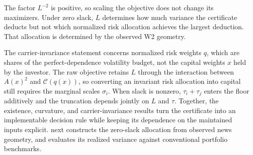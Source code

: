 The factor $L^{-2}$ is positive, so scaling the objective does not change its
maximizers.
Under zero slack, $L$ determines how much variance the certificate deducts
but not which normalized risk allocation achieves the largest deduction.
That allocation is determined by the observed W2 geometry.

The carrier-invariance statement concerns normalized risk weights
$q$, which are shares of the perfect-dependence volatility budget,
not the capital weights $x$ held by the investor.
The raw objective retains $L$ through the interaction between $A(x)^2$ and
$\mathcal C(q(x))$, so converting an invariant risk allocation into capital
still requires the marginal scales $\sigma_i$.
When slack is nonzero, $\tau_i+\tau_j$ enters the floor additively and the
truncation depends jointly on $L$ and $\tau$.
Together, the existence, curvature, and carrier-invariance results
turn the certificate into an implementable decision rule while
keeping its dependence on the maintained inputs explicit.
 next constructs the zero-slack allocation
from observed news geometry, and 
evaluates its realized variance against conventional portfolio benchmarks.
